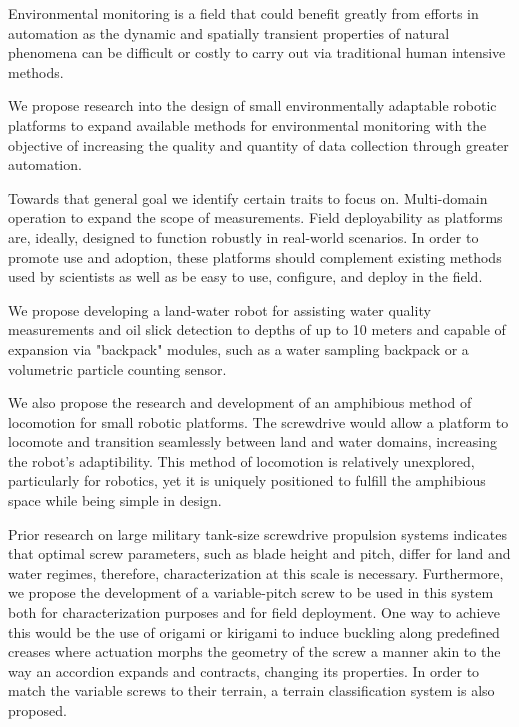 \begin{singlespace}
  

Environmental monitoring is a field that could benefit greatly from efforts in automation as the dynamic and spatially transient properties of natural phenomena can be difficult or costly to carry out via traditional human intensive methods. 

We propose research into the design of small environmentally adaptable robotic platforms to expand available methods for environmental monitoring with the objective of increasing the quality and quantity of data collection through greater automation. 

Towards that general goal we identify certain traits to focus on. Multi-domain operation to expand the scope of measurements. Field deployability as platforms are, ideally, designed to function robustly in real-world scenarios. In order to promote use and adoption, these platforms should complement existing methods used by scientists as well as be easy to use, configure, and deploy in the field. 

We propose developing a land-water robot for assisting water quality measurements and oil slick detection to depths of up to 10 meters and capable of expansion via "backpack" modules, such as a water sampling backpack or a volumetric particle counting sensor. 

We also propose the research and development of an amphibious method of locomotion for small robotic platforms. The screwdrive would allow a platform to locomote and transition seamlessly between land and water domains, increasing the robot's adaptibility. This method of locomotion is relatively unexplored, particularly for robotics, yet it is uniquely positioned to fulfill the amphibious space while being simple in design. 

Prior research on large military tank-size screwdrive propulsion systems indicates that optimal screw parameters, such as blade height and pitch, differ for land and water regimes, therefore, characterization at this scale is necessary. Furthermore, we propose the development of a variable-pitch screw to be used in this system both for characterization purposes and for field deployment. One way to achieve this would be the use of origami or kirigami to induce buckling along predefined creases where actuation morphs the geometry of the screw a manner akin to the way an accordion expands and contracts, changing its properties. In order to match the variable screws to their terrain, a terrain classification system is also proposed.  


\end{singlespace}
